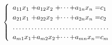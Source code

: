\documentclass{book}
\begin{document}
\begin{equation*}
\begin{cases}
\begin{array}{*{3}{l@{+}}l@{=}l}
a_{11}x_{1} & a_{12}x_{2} & \cdots &
a_{1n}x_{n} & c_{1} \\
a_{21}x_{1} & a_{22}x_{2} & \cdots &
a_{2n}x_{n} & c_{2} \\
\hdotsfor{5}\\
a_{m1}x_{1} & a_{m2}x_{2} & \cdots &
a_{mn}x_{n} & c_{m}
\end{array}
\end{cases}
\end{equation*}
\end{document}
